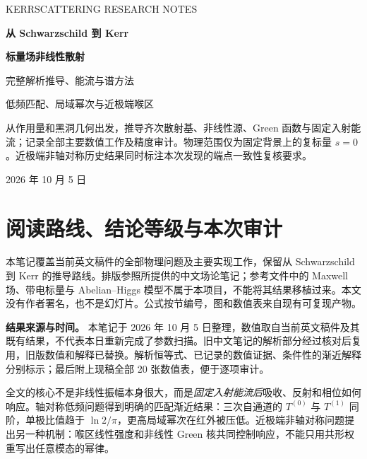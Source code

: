 \documentclass[UTF8,fontset=fandol,11pt,a4paper]{ctexart}
\begin{document}
\begin{titlepage}\centering\vspace*{21mm}
{\small\color{ink} KERRSCATTERING RESEARCH NOTES\par}
\vspace{12mm}
{\Huge\bfseries 从 Schwarzschild 到 Kerr\par}
\vspace{7mm}
{\Huge\bfseries 标量场非线性散射\par}
\vspace{9mm}
{\Large 完整解析推导、能流与谱方法\par}
\vspace{6mm}
{\large 低频匹配、局域幂次与近极端喉区\par}
\vspace{17mm}
\begin{minipage}{0.88\textwidth}\begin{note}
从作用量和黑洞几何出发，推导齐次散射基、非线性源、Green 函数与固定入射能流；记录全部主要数值工作及精度审计。物理范围仅为固定背景上的复标量 $s=0$。近极端非轴对称历史结果同时标注本次发现的端点一致性复核要求。
\end{note}\end{minipage}
\vfill{\large 2026 年 10 月 5 日\par}
\vspace{6mm}{\small 基于当前英文稿件与项目产物整理；不覆盖原稿\par}
\end{titlepage}
\tableofcontents\clearpage
\section{阅读路线、结论等级与本次审计}
本笔记覆盖当前英文稿件的全部物理问题及主要实现工作，保留从 Schwarzschild 到 Kerr 的推导路线。排版参照所提供的中文场论笔记；参考文件中的 Maxwell 场、带电标量与 Abelian--Higgs 模型不属于本项目，不能将其结果移植过来。本文没有作者署名，也不是幻灯片。公式按节编号，图和数值表来自现有可复现产物。

\begin{note}
\textbf{结果来源与时间。} 本笔记于 2026 年 10 月 5 日整理，数值取自当前英文稿件及其既有结果，不代表本日重新完成了参数扫描。旧中文笔记的解析部分经过核对后复用，旧版数值和解释已替换。解析恒等式、已记录的数值证据、条件性的渐近解释分别标示；最后附上现稿全部 20 张数值表，便于逐项审计。
\end{note}

全文的核心不是非线性振幅本身很大，而是\emph{固定入射能流后}吸收、反射和相位如何响应。轴对称低频问题得到明确的匹配渐近结果：三次自通道的 $T^{(0)}$ 与 $T^{(1)}$ 同阶，单极比值趋于 $\ln2/\pi$，更高局域幂次在红外被压低。近极端非轴对称问题提出另一种机制：喉区线性强度和非线性 Green 核共同控制响应，不能只用共形权重写出任意模态的幂律。
\end{document}
